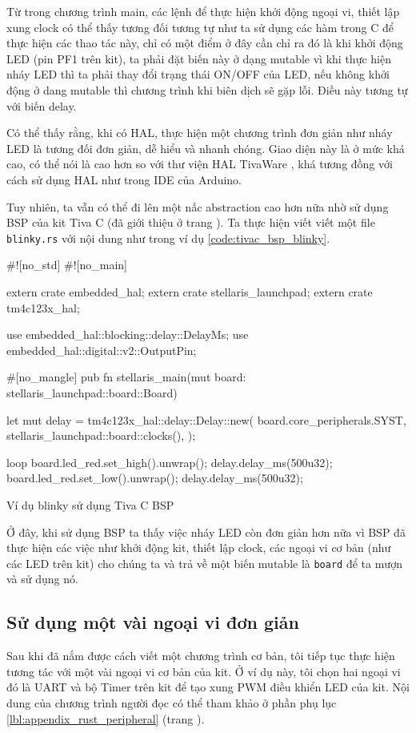 Từ trong chương trình main, các lệnh để thực hiện khởi động ngoại vi, thiết lập xung clock có thể thấy tương đối tương tự như ta sử dụng các hàm trong C để thực hiện các thao tác này, chỉ có một điểm ở đây cần chỉ ra đó là khi khởi động LED (pin PF1 trên kit), ta phải đặt biến này ở dạng mutable vì khi thực hiện nháy LED thì ta phải thay đổi trạng thái ON/OFF của LED, nếu không khởi động ở dang mutable thì chương trình khi biên dịch sẽ gặp lỗi. Điều này tương tự với biến delay.

Có thể thấy rằng, khi có HAL, thực hiện một chương trình đơn giản như nháy LED là tương đối đơn giản, dễ hiểu và nhanh chóng.
Giao diện này là ở mức khá cao, có thể nói là cao hơn so với thư viện HAL TivaWare \cite{tivac_tivaware}, khá tương đồng với cách sử dụng HAL như trong IDE của Arduino.

Tuy nhiên, ta vẫn có thể đi lên một nấc abstraction cao hơn nữa nhờ sử dụng BSP của kit Tiva C (đã giới thiệu ở trang \pageref{lbl:tivac_bsp}).
Ta thực hiện viết viết một file \texttt{blinky.rs} với nội dung như trong ví dụ \ref{code:tivac_bsp_blinky}.

\begin{listing}[ht]
\begin{rustcode}
#![no_std]
#![no_main]

extern crate embedded_hal;
extern crate stellaris_launchpad;
extern crate tm4c123x_hal;

use embedded_hal::blocking::delay::DelayMs;
use embedded_hal::digital::v2::OutputPin;

#[no_mangle]
pub fn stellaris_main(mut board: stellaris_launchpad::board::Board) {
    let mut delay = tm4c123x_hal::delay::Delay::new(
        board.core_peripherals.SYST,
        stellaris_launchpad::board::clocks(),
    );

    loop {
        board.led_red.set_high().unwrap();
        delay.delay_ms(500u32);
        board.led_red.set_low().unwrap();
        delay.delay_ms(500u32);
    }
}
\end{rustcode}
\caption{Ví dụ blinky sử dụng Tiva C BSP}
\label{code:tivac_bsp_blinky}
\end{listing}

Ở đây, khi sử dụng BSP ta thấy việc nháy LED còn đơn giản hơn nữa vì BSP đã thực hiện các việc như khởi động kit, thiết lập clock, các ngoại vi cơ bản (như các LED trên kit) cho chúng ta và trả về một biến mutable là \texttt{board} để ta mượn và sử dụng nó.

\subsection{Sử dụng một vài ngoại vi đơn giản}\label{lbl:rust_peripheral}
Sau khi đã nắm được cách viết một chương trình cơ bản, tôi tiếp tục thực hiện tương tác với một vài ngoại vi cơ bản của kit.
Ở ví dụ này, tôi chọn hai ngoại vi đó là UART và bộ Timer trên kit để tạo xung PWM điều khiển LED của kit.
Nội dung của chương trình người đọc có thể tham khảo ở phần phụ lục \ref{lbl:appendix_rust_peripheral} (trang \pageref{lbl:appendix_rust_peripheral}).

